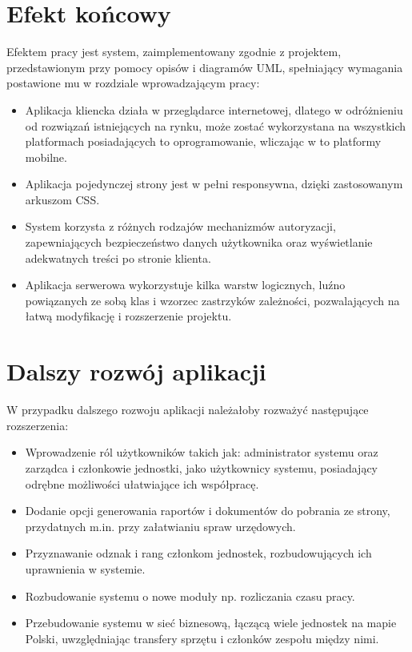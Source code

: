 \section{Efekt końcowy}

Efektem pracy jest system, zaimplementowany zgodnie z projektem, przedstawionym przy pomocy opisów i diagramów UML, spełniający wymagania postawione mu w rozdziale wprowadzającym pracy:

\begin{itemize}
    \item Aplikacja kliencka działa w przeglądarce internetowej, dlatego w odróżnieniu od rozwiązań istniejących na rynku, może zostać wykorzystana na wszystkich platformach posiadających to oprogramowanie, wliczając w to platformy mobilne.
    \item Aplikacja pojedynczej strony jest w pełni responsywna, dzięki zastosowanym arkuszom CSS.
    \item System korzysta z różnych rodzajów mechanizmów autoryzacji, zapewniających bezpieczeństwo danych użytkownika oraz wyświetlanie adekwatnych treści po stronie klienta.
    \item Aplikacja serwerowa wykorzystuje kilka warstw logicznych, luźno powiązanych ze sobą klas i wzorzec zastrzyków zależności, pozwalających na łatwą modyfikację i rozszerzenie projektu.
\end{itemize}

\section{Dalszy rozwój aplikacji}

W przypadku dalszego rozwoju aplikacji należałoby rozważyć następujące rozszerzenia:

\begin{itemize}
    \item Wprowadzenie ról użytkowników takich jak: administrator systemu oraz zarządca i członkowie jednostki, jako użytkownicy systemu, posiadający odrębne możliwości ułatwiające ich współpracę.
    \item Dodanie opcji generowania raportów i dokumentów do pobrania ze strony, przydatnych m.in. przy załatwianiu spraw urzędowych.
    \item Przyznawanie odznak i rang członkom jednostek, rozbudowujących ich uprawnienia w systemie.
    \item Rozbudowanie systemu o nowe moduły np. rozliczania czasu pracy.
    \item Przebudowanie systemu w sieć biznesową, łączącą wiele jednostek na mapie Polski, uwzględniając transfery sprzętu i członków zespołu między nimi.
\end{itemize}

